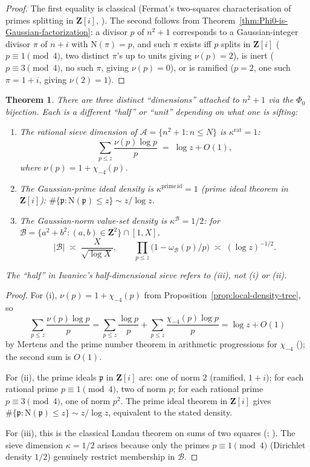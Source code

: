 \documentclass[11pt]{article}
\newtheorem{theorem}{Theorem}[section]
\theoremstyle{definition}
\newcommand{\Z}{\mathbf{Z}}
\newcommand{\Norm}{\mathrm{N}}
\begin{document}
\begin{proof}
The first equality is classical (Fermat's two-squares characterisation of primes splitting
in $\Z[i]$, \cite[Thm.~5.4]{cox}). The second follows from
Theorem~\ref{thm:Phi0-is-Gaussian-factorization}: a divisor $p$ of $n^2+1$ corresponds to a
Gaussian-integer divisor $\pi$ of $n+i$ with $\Norm(\pi) = p$, and such $\pi$ exists iff
$p$ splits in $\Z[i]$ ($p \equiv 1 \pmod 4$, two distinct $\pi$'s up to units giving
$\nu(p) = 2$), is inert ($p\equiv 3\pmod 4$, no such $\pi$, giving $\nu(p) = 0$), or is
ramified ($p = 2$, one such $\pi = 1+i$, giving $\nu(2) = 1$).
\end{proof}

\begin{theorem}\label{thm:dim-of-sieves}
There are three distinct ``dimensions'' attached to $n^2+1$ via the $\Phi_0$ bijection.
Each is a different ``half'' or ``unit'' depending on what one is sifting:
\begin{enumerate}
\item[(i)] The \emph{rational sieve dimension} of $\mathcal{A} = \{n^2+1 : n\le N\}$ is
$\kappa^{\mathrm{rat}} = 1$:
\[
   \sum_{p\le z} \frac{\nu(p)\log p}{p} \;=\; \log z + O(1),
\]
where $\nu(p) = 1 + \chi_{-4}(p)$.
\item[(ii)] The \emph{Gaussian-prime ideal density} is $\kappa^{\mathrm{prime\,id}}=1$
(prime ideal theorem in $\Z[i]$): $\#\{\mathfrak{p} : \Norm(\mathfrak{p}) \le z\} \sim z/\log z$.
\item[(iii)] The \emph{Gaussian-norm value-set density} is $\kappa^{\mathcal{B}} = 1/2$:
for $\mathcal{B} = \{a^2 + b^2 : (a,b) \in \Z^2\} \cap [1,X]$,
\[
   |\mathcal{B}| \;\asymp\; \frac{X}{\sqrt{\log X}}, \qquad
   \prod_{p\le z}\bigl(1 - \omega_{\mathcal{B}}(p)/p\bigr) \;\asymp\; (\log z)^{-1/2}.
\]
\end{enumerate}
The ``half'' in Iwaniec's half-dimensional sieve refers to (iii), not (i) or (ii).
\end{theorem}

\begin{proof}
For (i), $\nu(p) = 1 + \chi_{-4}(p)$ from Proposition~\ref{prop:local-density-tree}, so
\[
  \sum_{p \le z}\frac{\nu(p)\log p}{p}
   = \sum_{p \le z} \frac{\log p}{p} + \sum_{p\le z}\frac{\chi_{-4}(p)\log p}{p}
   = \log z + O(1)
\]
by Mertens and the prime number theorem in arithmetic progressions for $\chi_{-4}$
(\cite[\S 5]{IK}); the second sum is $O(1)$.

For (ii), the prime ideals $\mathfrak{p}$ in $\Z[i]$ are: one of norm $2$ (ramified, $1+i$);
for each rational prime $p\equiv 1\pmod 4$, two of norm $p$; for each rational prime
$p\equiv 3\pmod 4$, one of norm $p^2$. The prime ideal theorem in $\Z[i]$ gives
$\#\{\mathfrak{p} : \Norm(\mathfrak{p})\le z\} \sim z/\log z$, equivalent to the stated
density.

For (iii), this is the classical Landau theorem on sums of two squares
(\cite[\S 14.2]{IK}; \cite[Thm 1]{iwaniec1976}). The sieve dimension $\kappa = 1/2$
arises because only the primes $p \equiv 1 \pmod 4$ (Dirichlet density $1/2$) genuinely
restrict membership in $\mathcal{B}$.
\end{proof}
\end{document}
